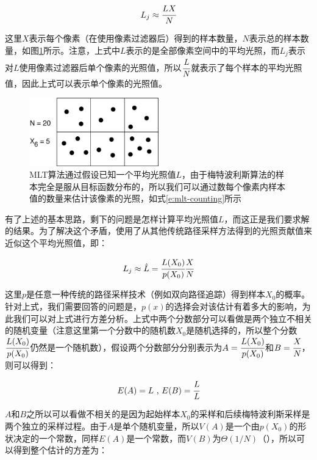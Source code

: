 \begin{equation}\label{e:mlt-counting}
	L_j\approx \cfrac{{L}X}{N}
\end{equation}

\noindent 这里$X$表示每个像素（在使用像素过滤器后）得到的样本数量，$N$表示总的样本数量，如图\ref{f:mlt-mlt-counting}所示。注意，上式中${L}$表示的是全部像素空间中的平均光照，而$L_j$表示对$L$使用像素过滤器后单个像素的光照值，所以$ \cfrac{{L}}{N}$就表示了每个样本的平均光照值，因此上式可以表示单个像素的光照值。

\begin{figure}
	\sidecaption
	\includegraphics[width=0.5\textwidth]{figures/mlt/mlt-counting}
	\caption{MLT算法通过假设已知一个平均光照值${L}$，由于梅特波利斯算法的样本完全是服从目标函数分布的，所以我们可以通过数每个像素内样本值的数量来估计该像素的光照，如式\ref{e:mlt-counting}所示}
	\label{f:mlt-mlt-counting}
\end{figure}

有了上述的基本思路，剩下的问题是怎样计算平均光照值${L}$，而这正是我们要求解的结果。为了解决这个矛盾，\cite{a:MetropolisLightTransport}使用了从其他传统路径采样方法得到的光照贡献值来近似这个平均光照值，即：

\begin{equation}\label{e:mlt-unbiased}
	L_j\approx\hat{L}= \cfrac{L(X_0)}{p(X_0)} \cfrac{X}{N}
\end{equation}

这里$p$是任意一种传统的路径采样技术（例如双向路径追踪）得到样本$X_0$的概率。针对上式，我们需要回答的问题是，$p(x)$的选择会对该估计有着多大的影响，为此我们可以对上式进行方差分析。上式中两个分数部分可以看做是两个独立不相关的随机变量（注意这里第一个分数中的随机数$X_0$是随机选择的，所以整个分数$ \cfrac{L(X_0)}{p(X_0)}$仍然是一个随机数），假设两个分数部分分别表示为$A= \cfrac{L(X_0)}{p(X_0)}$和$B= \cfrac{X}{N}$，则可以得到：

\begin{equation}
	E(A)={L}\text{ , }
	E(B)= \cfrac{L}{{L}}
\end{equation}

$A$和$B$之所以可以看做不相关的是因为起始样本$X_0$的采样和后续梅特波利斯采样是两个独立的采样过程。由于$A$是单个随机变量，所以$V(A)$是一个由$p(X_0)$的形状决定的一个常数，同样$E(A)$是一个常数，而$V(B)$为$\Theta(1/N)$（\cite{a:AVarianceAnalysisoftheMetropolisLightTransportAlgorithm}），所以可以得到整个估计的方差为：

